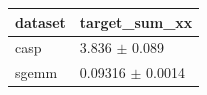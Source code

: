 \begin{tabular}{ll}
\toprule
dataset & target\_sum\_xx \\
\midrule
casp & 3.836 $\pm$ 0.089 \\
sgemm & 0.09316 $\pm$ 0.0014 \\
\bottomrule
\end{tabular}
